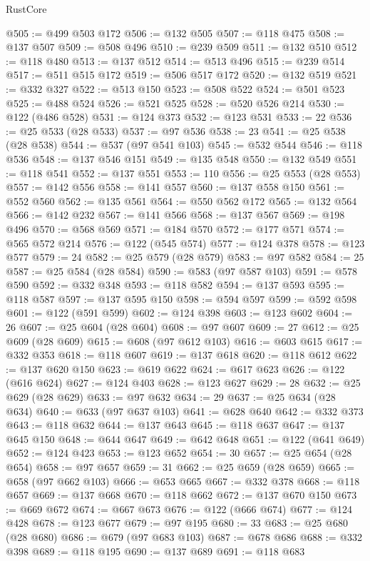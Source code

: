 \begin{lexlean}{RustCore}
\begin{coremodule}
@505 := @499 @503 @172
@506 := @132 @505
@507 := @118 @475
@508 := @137 @507
@509 := @508 @496
@510 := @239 @509
@511 := @132 @510
@512 := @118 @480
@513 := @137 @512
@514 := @513 @496
@515 := @239 @514
@517 := @511 @515 @172
@519 := @506 @517 @172
@520 := @132 @519
@521 := @332 @327
@522 := @513 @150
@523 := @508 @522
@524 := @501 @523
@525 := @488 @524
@526 := @521 @525
@528 := @520 @526 @214
@530 := @122 (@486 @528)
@531 := @124 @373
@532 := @123 @531
@533 := 22
@536 := @25 @533 (@28 @533)
@537 := @97 @536
@538 := 23
@541 := @25 @538 (@28 @538)
@544 := @537 (@97 @541 @103)
@545 := @532 @544
@546 := @118 @536
@548 := @137 @546 @151
@549 := @135 @548
@550 := @132 @549
@551 := @118 @541
@552 := @137 @551
@553 := 110
@556 := @25 @553 (@28 @553)
@557 := @142 @556
@558 := @141 @557
@560 := @137 @558 @150
@561 := @552 @560
@562 := @135 @561
@564 := @550 @562 @172
@565 := @132 @564
@566 := @142 @232
@567 := @141 @566
@568 := @137 @567
@569 := @198 @496
@570 := @568 @569
@571 := @184 @570
@572 := @177 @571
@574 := @565 @572 @214
@576 := @122 (@545 @574)
@577 := @124 @378
@578 := @123 @577
@579 := 24
@582 := @25 @579 (@28 @579)
@583 := @97 @582
@584 := 25
@587 := @25 @584 (@28 @584)
@590 := @583 (@97 @587 @103)
@591 := @578 @590
@592 := @332 @348
@593 := @118 @582
@594 := @137 @593
@595 := @118 @587
@597 := @137 @595 @150
@598 := @594 @597
@599 := @592 @598
@601 := @122 (@591 @599)
@602 := @124 @398
@603 := @123 @602
@604 := 26
@607 := @25 @604 (@28 @604)
@608 := @97 @607
@609 := 27
@612 := @25 @609 (@28 @609)
@615 := @608 (@97 @612 @103)
@616 := @603 @615
@617 := @332 @353
@618 := @118 @607
@619 := @137 @618
@620 := @118 @612
@622 := @137 @620 @150
@623 := @619 @622
@624 := @617 @623
@626 := @122 (@616 @624)
@627 := @124 @403
@628 := @123 @627
@629 := 28
@632 := @25 @629 (@28 @629)
@633 := @97 @632
@634 := 29
@637 := @25 @634 (@28 @634)
@640 := @633 (@97 @637 @103)
@641 := @628 @640
@642 := @332 @373
@643 := @118 @632
@644 := @137 @643
@645 := @118 @637
@647 := @137 @645 @150
@648 := @644 @647
@649 := @642 @648
@651 := @122 (@641 @649)
@652 := @124 @423
@653 := @123 @652
@654 := 30
@657 := @25 @654 (@28 @654)
@658 := @97 @657
@659 := 31
@662 := @25 @659 (@28 @659)
@665 := @658 (@97 @662 @103)
@666 := @653 @665
@667 := @332 @378
@668 := @118 @657
@669 := @137 @668
@670 := @118 @662
@672 := @137 @670 @150
@673 := @669 @672
@674 := @667 @673
@676 := @122 (@666 @674)
@677 := @124 @428
@678 := @123 @677
@679 := @97 @195
@680 := 33
@683 := @25 @680 (@28 @680)
@686 := @679 (@97 @683 @103)
@687 := @678 @686
@688 := @332 @398
@689 := @118 @195
@690 := @137 @689
@691 := @118 @683

\end{coremodule}
\end{lexlean}
